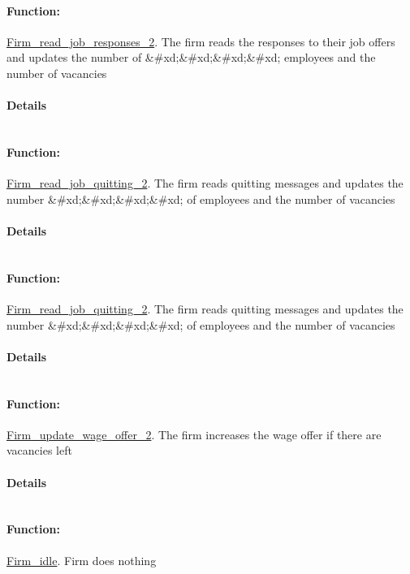 \documentclass[a4paper,11pt]{article}
\begin{document}
\paragraph{Function:}\url{Firm_read_job_responses_2}.
The firm reads the responses to their job offers and updates the number of \&\#xd;\&\#xd;\&\#xd;\&\#xd;
employees and the number of vacancies
\paragraph{Details}
\begin{verbatim}
\end{verbatim}
\paragraph{Function:}\url{Firm_read_job_quitting_2}.
The firm reads quitting messages and updates the number \&\#xd;\&\#xd;\&\#xd;\&\#xd;
of employees and the number of vacancies
\paragraph{Details}
\begin{verbatim}
\end{verbatim}
\paragraph{Function:}\url{Firm_read_job_quitting_2}.
The firm reads quitting messages and updates the number \&\#xd;\&\#xd;\&\#xd;\&\#xd;
of employees and the number of vacancies
\paragraph{Details}
\begin{verbatim}
\end{verbatim}
\paragraph{Function:}\url{Firm_update_wage_offer_2}.
The firm increases the wage offer if there are vacancies left
\paragraph{Details}
\begin{verbatim}
\end{verbatim}
\paragraph{Function:}\url{Firm_idle}.
Firm does nothing
\end{document}

